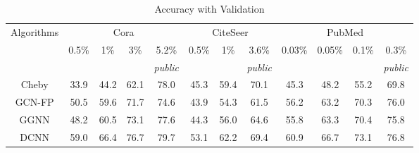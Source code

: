 \begin{table*}[htbp]
\setlength{\tabcolsep}{1.5pt}
  \centering
  \caption{Accuracy with Validation}
  \scriptsize
    \begin{tabular}{c|cccc|ccc|cccc}
    \multirow{3}[1]{*}{Algorithms} & \multicolumn{4}{c|}{Cora}     & \multicolumn{3}{c|}{CiteSeer} & \multicolumn{4}{c}{PubMed} \\
          & \multirow{2}[1]{*}{0.5\%} & \multirow{2}[1]{*}{1\%} & \multirow{2}[1]{*}{3\%} & 5.2\% & \multirow{2}[1]{*}{0.5\%} & \multirow{2}[1]{*}{1\%} & 3.6\% & \multirow{2}[1]{*}{0.03\%} & \multirow{2}[1]{*}{0.05\%} & \multirow{2}[1]{*}{0.1\%} & 0.3\% \\
          &       &       &       & \textit{public} &       &       & \textit{public} &       &       &       & \textit{public} \\
    \midrule
    Cheby & \cellcolor[rgb]{ .973,  .412,  .42}33.9 & \cellcolor[rgb]{ .973,  .412,  .42}44.2 & \cellcolor[rgb]{ .976,  .545,  .443}62.1 & \cellcolor[rgb]{ .988,  .753,  .482}78.0 & \cellcolor[rgb]{ 1,  .922,  .518}45.3 & \cellcolor[rgb]{ 1,  .922,  .518}59.4 & \cellcolor[rgb]{ .847,  .878,  .51}70.1 & \cellcolor[rgb]{ .973,  .412,  .42}45.3 & \cellcolor[rgb]{ .973,  .412,  .42}48.2 & \cellcolor[rgb]{ .973,  .412,  .42}55.2 & \cellcolor[rgb]{ .973,  .412,  .42}69.8 \\
    GCN-FP & \cellcolor[rgb]{ .996,  .906,  .514}50.5 & \cellcolor[rgb]{ .992,  .843,  .502}59.6 & \cellcolor[rgb]{ .992,  .796,  .49}71.7 & \cellcolor[rgb]{ .973,  .42,  .42}74.6 & \cellcolor[rgb]{ .996,  .859,  .502}43.9 & \cellcolor[rgb]{ .988,  .718,  .478}54.3 & \cellcolor[rgb]{ .973,  .412,  .42}61.5 & \cellcolor[rgb]{ .996,  .851,  .502}56.2 & \cellcolor[rgb]{ .996,  .875,  .506}63.2 & \cellcolor[rgb]{ .996,  .847,  .502}70.3 & \cellcolor[rgb]{ .992,  .804,  .494}76.0 \\
    GGNN  & \cellcolor[rgb]{ .992,  .839,  .502}48.2 & \cellcolor[rgb]{ .996,  .871,  .506}60.5 & \cellcolor[rgb]{ .992,  .831,  .498}73.1 & \cellcolor[rgb]{ .988,  .714,  .475}77.6 & \cellcolor[rgb]{ .996,  .875,  .506}44.3 & \cellcolor[rgb]{ .992,  .784,  .49}56.0 & \cellcolor[rgb]{ .984,  .627,  .459}64.6 & \cellcolor[rgb]{ .992,  .835,  .498}55.8 & \cellcolor[rgb]{ .996,  .878,  .51}63.3 & \cellcolor[rgb]{ .996,  .851,  .502}70.4 & \cellcolor[rgb]{ .992,  .792,  .49}75.8 \\
    DCNN  & \cellcolor[rgb]{ .788,  .863,  .506}59.0 & \cellcolor[rgb]{ .839,  .875,  .51}66.4 & \cellcolor[rgb]{ .98,  .918,  .518}76.7 & \cellcolor[rgb]{ 1,  .922,  .518}79.7 & \cellcolor[rgb]{ .765,  .855,  .506}53.1 & \cellcolor[rgb]{ .808,  .867,  .51}62.2 & \cellcolor[rgb]{ .925,  .902,  .514}69.4 & \cellcolor[rgb]{ .871,  .886,  .514}60.9 & \cellcolor[rgb]{ .855,  .882,  .51}66.7 & \cellcolor[rgb]{ .957,  .91,  .518}73.1 & \cellcolor[rgb]{ .996,  .855,  .502}76.8 \\

\end{tabular}
\end{table*}

